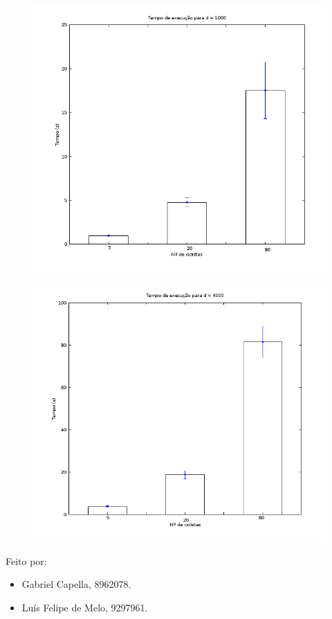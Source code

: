 \documentclass{beamer}
\begin{document}
\begin{frame}
	\begin{figure}[!h]
		\centering
		\includegraphics[scale=0.4]{8.png}
	\end{figure}
\end{frame}

\begin{frame}
	\begin{figure}[!h]
		\centering
		\includegraphics[scale=0.4]{9.png}
	\end{figure}
\end{frame}

\begin{frame}
	Feito por:
	\begin{itemize}
		\item Gabriel Capella, 8962078.
		\item Luís Felipe de Melo, 9297961.
	\end{itemize}
	
\end{frame}
\end{document}
